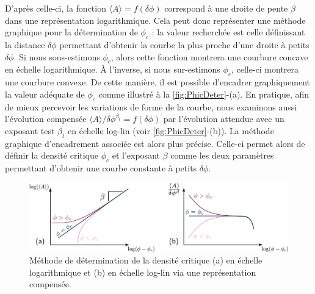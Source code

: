 \noindent D'après celle-ci, la fonction $\langle A \rangle = f(\delta\phi)$ correspond à une droite de pente $\beta$ dans une représentation logarithmique. Cela peut donc représenter une méthode graphique pour la détermination de $\phi_c$ : la valeur recherchée est celle définissant la distance $\delta\phi$ permettant d'obtenir la courbe la plus proche d'une droite à petits $\delta\phi$. Si nous sous-estimons $\phi_c$, alors cette fonction montrera une courbure concave en échelle logarithmique. \`A l'inverse, si nous sur-estimons $\phi_c$, celle-ci montrera une courbure convexe. De cette manière, il est possible d'encadrer graphiquement la valeur adéquate de $\phi_c$ comme illustré à la \autoref{fig:PhicDeter}-(a). En pratique, afin de mieux percevoir les variations de forme de la courbe, nous examinons aussi l'évolution compensée $\langle A \rangle/\delta\phi^{\beta_t} = f(\delta\phi)$ par l'évolution attendue avec un exposant test $\beta_t$ en échelle log-lin (voir \autoref{fig:PhicDeter}-(b)). La méthode graphique d'encadrement associée est alors plus précise. Celle-ci  permet alors de définir la densité critique $\phi_c$ et l'exposant $\beta$ comme les deux paramètres permettant d'obtenir une courbe constante à petits $\delta\phi$.

\begin{figure}[h]
	\centering
	\includegraphics[width=\textwidth]{Chapitre2/Figures/Methodes/Phic.pdf}
	\caption{Méthode de détermination de la densité critique (a) en échelle logarithmique et (b) en échelle log-lin via une représentation compensée.}
	\label{fig:PhicDeter}
\end{figure}

